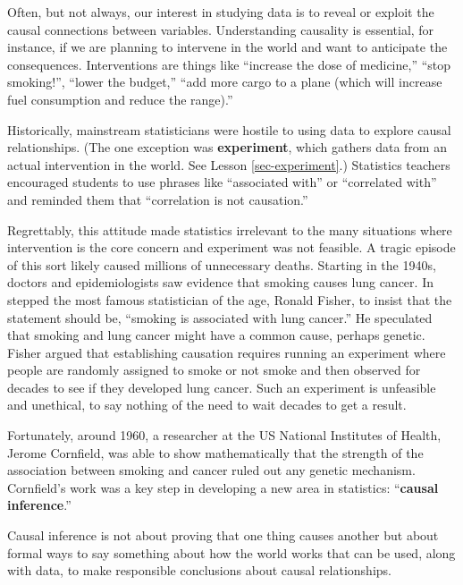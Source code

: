 \documentclass[
  letterpaper,
  DIV=11,
  numbers=noendperiod,
  oneside]{scrartcl}
\begin{document}
\begin{tcolorbox}[enhanced jigsaw, colbacktitle=quarto-callout-note-color!10!white, opacityback=0, breakable, opacitybacktitle=0.6, colback=white, coltitle=black, arc=.35mm, title=\textcolor{quarto-callout-note-color}{\faInfo}\hspace{0.5em}{Causal nihilism and smoking}, left=2mm, colframe=quarto-callout-note-color-frame, rightrule=.15mm, bottomrule=.15mm, leftrule=.75mm, bottomtitle=1mm, toptitle=1mm, titlerule=0mm, toprule=.15mm]

Often, but not always, our interest in studying data is to reveal or
exploit the causal connections between variables. Understanding
causality is essential, for instance, if we are planning to intervene in
the world and want to anticipate the consequences. Interventions are
things like ``increase the dose of medicine,'' ``stop smoking!'',
``lower the budget,'' ``add more cargo to a plane (which will increase
fuel consumption and reduce the range).''

Historically, mainstream statisticians were hostile to using data to
explore causal relationships. (The one exception was
\textbf{experiment}, which gathers data from an actual intervention in
the world. See Lesson \ref{sec-experiment}.) Statistics teachers
encouraged students to use phrases like ``associated with'' or
``correlated with'' and reminded them that ``correlation is not
causation.''

Regrettably, this attitude made statistics irrelevant to the many
situations where intervention is the core concern and experiment was not
feasible. A tragic episode of this sort likely caused millions of
unnecessary deaths. Starting in the 1940s, doctors and epidemiologists
saw evidence that smoking causes lung cancer. In stepped the most famous
statistician of the age, Ronald Fisher, to insist that the statement
should be, ``smoking is associated with lung cancer.'' He speculated
that smoking and lung cancer might have a common cause, perhaps genetic.
Fisher argued that establishing causation requires running an experiment
where people are randomly assigned to smoke or not smoke and then
observed for decades to see if they developed lung cancer. Such an
experiment is unfeasible and unethical, to say nothing of the need to
wait decades to get a result.

Fortunately, around 1960, a researcher at the US National Institutes of
Health, Jerome Cornfield, was able to show mathematically that the
strength of the association between smoking and cancer ruled out any
genetic mechanism. Cornfield's work was a key step in developing a new
area in statistics: ``\textbf{causal inference}.''

Causal inference is not about proving that one thing causes another but
about formal ways to say something about how the world works that can be
used, along with data, to make responsible conclusions about causal
relationships.

\end{tcolorbox}
\end{document}
